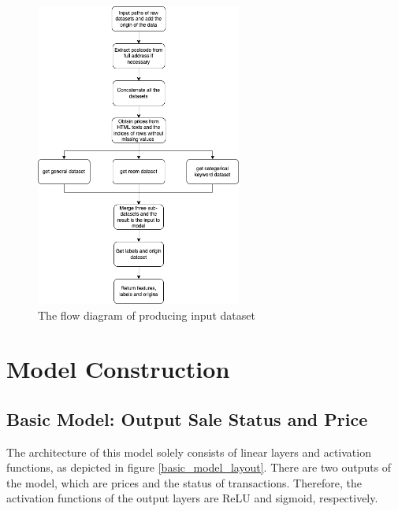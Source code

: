 \documentclass[12pt,twoside]{report}
\begin{document}
\begin{figure}[!htbp]
	\centering
	\includegraphics[height=10cm]{create_input_dataset}
	\caption{The flow diagram of producing  input dataset}
	\label{create_input_dataset}
\end{figure}

\section{Model Construction}

\subsection{Basic Model: Output Sale Status and Price}
\label{basic_model_price_status_construction}
The architecture of this model solely consists of linear layers and activation functions, as depicted in figure \ref{basic_model_layout}. There are two outputs of the model, which are prices and the status of transactions. Therefore, the activation functions of the output layers are ReLU and sigmoid, respectively.
\\
\end{document}
